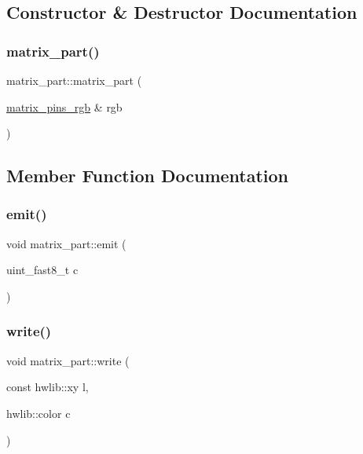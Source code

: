 \subsection{Constructor \& Destructor Documentation}
\mbox{\label{classmatrix__part_add901206be9433d77e2b12a7fd5b67ad}} 
\subsubsection{\texorpdfstring{matrix\+\_\+part()}{matrix\_part()}}
{\footnotesize\ttfamily matrix\+\_\+part\+::matrix\+\_\+part (\begin{DoxyParamCaption}\item[{\hyperlink{classmatrix__pins__rgb}{matrix\+\_\+pins\+\_\+rgb} \&}]{rgb }\end{DoxyParamCaption})\hspace{0.3cm}{\ttfamily [inline]}}



\subsection{Member Function Documentation}
\mbox{\label{classmatrix__part_ae4c419aa81e5895dde34bfecaccd7eba}} 
\subsubsection{\texorpdfstring{emit()}{emit()}}
{\footnotesize\ttfamily void matrix\+\_\+part\+::emit (\begin{DoxyParamCaption}\item[{uint\+\_\+fast8\+\_\+t}]{c }\end{DoxyParamCaption})\hspace{0.3cm}{\ttfamily [inline]}}

\mbox{\label{classmatrix__part_a2a218481c377245fbf5fbd74c9cf467e}} 
\subsubsection{\texorpdfstring{write()}{write()}}
{\footnotesize\ttfamily void matrix\+\_\+part\+::write (\begin{DoxyParamCaption}\item[{const hwlib\+::xy}]{l,  }\item[{hwlib\+::color}]{c }\end{DoxyParamCaption})\hspace{0.3cm}{\ttfamily [inline]}}



